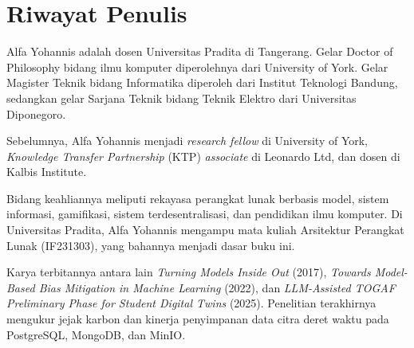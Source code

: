 \chapter{Riwayat Penulis}

Alfa Yohannis adalah dosen Universitas Pradita di Tangerang. Gelar Doctor of
Philosophy bidang ilmu komputer diperolehnya dari University of York. Gelar
Magister Teknik bidang Informatika diperoleh dari Institut Teknologi Bandung,
sedangkan gelar Sarjana Teknik bidang Teknik Elektro dari Universitas
Diponegoro.

Sebelumnya, Alfa Yohannis menjadi \textit{research fellow} di University of York,
\textit{Knowledge Transfer Partnership} (KTP) \textit{associate} di Leonardo
Ltd, dan dosen di Kalbis Institute.

Bidang keahliannya meliputi rekayasa perangkat lunak berbasis model, sistem
informasi, gamifikasi, sistem terdesentralisasi, dan pendidikan ilmu komputer.
Di Universitas Pradita, Alfa Yohannis mengampu mata kuliah Arsitektur Perangkat
Lunak (IF231303), yang bahannya menjadi dasar buku ini.

Karya terbitannya antara lain \textit{Turning Models Inside Out} (2017),
\textit{Towards Model-Based Bias Mitigation in Machine Learning} (2022), dan
\textit{LLM-Assisted TOGAF Preliminary Phase for Student Digital Twins} (2025).
Penelitian terakhirnya mengukur jejak karbon dan kinerja penyimpanan data citra
deret waktu pada PostgreSQL, MongoDB, dan MinIO.
